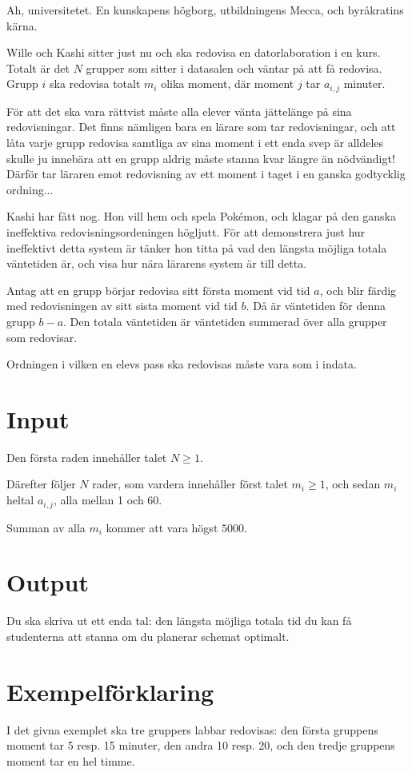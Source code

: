 
Ah, universitetet. En kunskapens högborg, utbildningens Mecca, och byråkratins kärna.

Wille och Kashi sitter just nu och ska redovisa en datorlaboration i en kurs. Totalt
är det $N$ grupper som sitter i datasalen och väntar på att få redovisa. Grupp $i$
ska redovisa totalt $m_i$ olika moment, där moment $j$ tar $a_{i, j}$ minuter.

För att det ska vara rättvist måste alla elever vänta jättelänge på sina redovisningar.
Det finns nämligen bara en lärare som tar redovisningar, och att låta varje grupp
redovisa samtliga av sina moment i ett enda svep är alldeles skulle ju innebära
att en grupp aldrig måste stanna kvar längre än nödvändigt! Därför tar läraren
emot redovisning av ett moment i taget i en ganska godtycklig ordning...

Kashi har fått nog. Hon vill hem och spela Pokémon, och klagar på den ganska
ineffektiva redovisningsordeningen högljutt. För att demonstrera just hur ineffektivt
detta system är tänker hon titta på vad den längsta möjliga totala väntetiden är,
och visa hur nära lärarens system är till detta.

Antag att en grupp börjar redovisa sitt första moment vid tid $a$, och
blir färdig med redovisningen av sitt sista moment vid tid $b$. Då är väntetiden
för denna grupp $b - a$. Den totala väntetiden är väntetiden summerad över alla
grupper som redovisar.

Ordningen i vilken en elevs pass ska redovisas måste vara som i indata.

\section*{Input}
Den första raden innehåller talet $N \ge 1$.

Därefter följer $N$ rader, som vardera innehåller först talet $m_i \ge 1$, och sedan $m_i$ heltal $a_{i,j}$, alla mellan 1 och 60.

Summan av alla $m_i$ kommer att vara högst $5000$.

\section*{Output}
Du ska skriva ut ett enda tal: den längsta möjliga totala tid du kan få studenterna att stanna om du planerar schemat optimalt.

\section*{Exempelförklaring}
I det givna exemplet ska tre gruppers labbar redovisas: den första gruppens moment tar 5 resp. 15 minuter, den andra 10 resp. 20, och den tredje gruppens moment tar en hel timme.

